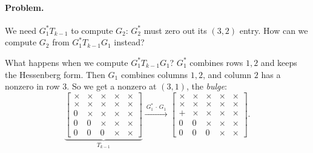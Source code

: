 \paragraph{Problem.} We need $G_1^\ast T_{k-1}$ to compute $G_2$: $G_2^\ast$ must zero out its $(3,2)$ entry. How can we compute $G_2$ from $G_1^\ast T_{k-1}G_1$ instead?

What happens when we compute $G_1^\ast T_{k-1}G_1$? $G_1^\ast$ combines rows $1, 2$ and keeps the Hessenberg form. Then $G_1$ combines columns $1, 2$, and column $2$ has a nonzero in row $3$. So we get a nonzero at $(3,1)$, the \emph{bulge}:
\begin{equation}
  \underbrace{\begin{bmatrix} \times & \times & \times & \times & \times \\ \times & \times & \times & \times & \times \\ 0 & \times & \times & \times & \times \\ 0 & 0 & \times & \times & \times \\ 0 & 0 & 0 & \times & \times \end{bmatrix}}_{T_{k-1}}
  \xrightarrow{\ G_1^\ast\,\cdot\,G_1\ }
  \begin{bmatrix} \times & \times & \times & \times & \times \\ \times & \times & \times & \times & \times \\ \bm{+} & \times & \times & \times & \times \\ 0 & 0 & \times & \times & \times \\ 0 & 0 & 0 & \times & \times \end{bmatrix}.
\end{equation}

